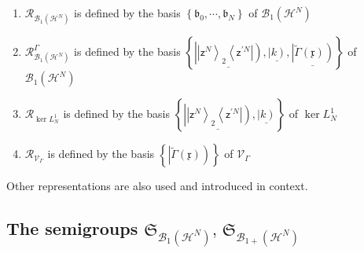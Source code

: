 \documentclass[aps,preprint]{revtex4}%
\begin{document}
\begin{enumerate}
\item $\mathcal{R}_{\mathcal{B}_{1}\left(  \mathcal{H}^{N}\right)  }$ is
defined by the basis $\left\{  \mathfrak{b}_{0},\cdots,\mathfrak{b}%
_{N}\right\}  $ of $\mathcal{B}_{1}\left(  \mathcal{H}^{N}\right)  $

\item $\mathcal{R}_{\mathcal{B}_{1}\left(  \mathcal{H}^{N}\right)  }^{\Gamma}$
is defined by the basis $\left\{  \underline{\left\vert \left\vert
\mathsf{z}^{N}\right\rangle _{2}\left\langle \mathsf{z}^{\prime N}\right\vert
\right)  },\underline{\left\vert k\right)  },\underline{\left\vert
\tilde{\Gamma}\left(  \mathfrak{x}\right)  \right)  }\right\}  $ of
$\mathcal{B}_{1}\left(  \mathcal{H}^{N}\right)  $

\item $\mathcal{R}_{\ker L_{N}^{1}}$ is defined by the basis $\left\{
\underline{\left\vert \left\vert \mathsf{z}^{N}\right\rangle _{2}\left\langle
\mathsf{z}^{\prime N}\right\vert \right)  },\underline{\left\vert k\right)
}\right\}  $ of $\ker L_{N}^{1}$

\item $\mathcal{R}_{\mathcal{V}_{\Gamma}}$ is defined by the basis $\left\{
\left\vert \tilde{\Gamma}\left(  \mathfrak{x}\right)  \right)  \right\}  $ of
$\mathcal{V}_{\Gamma}$
\end{enumerate}

Other representations are also used and introduced in context.

\subsection{The semigroups $\mathfrak{S}_{\mathcal{B}_{1}\left(
\mathcal{H}^{N}\right)  },\,\mathfrak{S}_{\mathcal{B}_{1+}\left(
\mathcal{H}^{N}\right)  } $}
\end{document}
